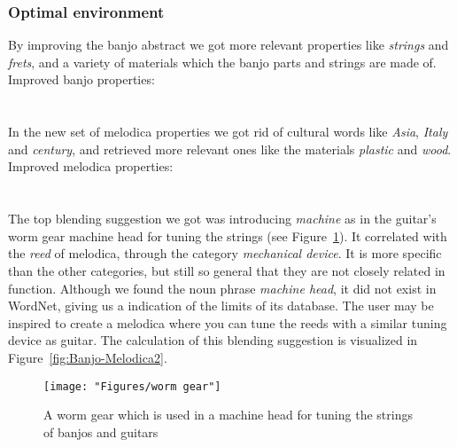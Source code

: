 \subsubsection{Optimal environment}
By improving the banjo abstract we got more relevant properties like \emph{strings} and \emph{frets}, and a variety of materials which the banjo parts and strings are made of.
\\Improved banjo properties:\\
\noindent{}	
\\\\In the new set of melodica properties we got rid of cultural words like \emph{Asia}, \emph{Italy} and \emph{century}, and retrieved more relevant ones like the materials \emph{plastic} and \emph{wood}.
\\Improved melodica properties:\\
\noindent{}
\\\\The top blending suggestion we got was introducing \emph{machine} as in the guitar's worm gear machine head for tuning the strings (see Figure~\ref{fig:worm-gear}). It correlated with the \emph{reed} of melodica, through the category \emph{mechanical device}. It is more specific than the other categories, but still so general that they are not closely related in function. Although we found the noun phrase \emph{machine head}, it did not exist in WordNet, giving us a indication of the limits of its database. The user may be inspired to create a melodica where you can tune the reeds with a similar tuning device as guitar.
The calculation of this blending suggestion is visualized in Figure~\ref{fig:Banjo-Melodica2}.

\begin{figure}
\centering
\texttt{[image: "Figures/worm gear"]}
\caption{A worm gear which is used in a machine head for tuning the strings of banjos and guitars}
\label{fig:worm-gear}
\end{figure}

